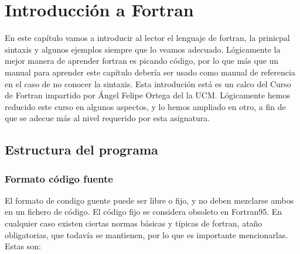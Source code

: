 \chapter{Introducción a Fortran}

En este capítulo vamos a introducir al lector el lenguaje de fortran, la prinicpal sintaxis y algunos ejemplos siempre que lo veamos adecuado. Lógicamente la mejor manera de aprender fortran es picando código, por lo que más que un manual para aprender este capítulo debería ser usado como manual de referencia en el caso de no conocer la sintaxis. Esta introdución está es un calco del Curso de Fortran impartido por Ángel Felipe Ortega del la UCM. Lógicamente hemos reducido este curso en algunos aspectos, y lo hemos ampliado en otro, a fin de que se adecue más al nivel requerido por esta asignatura.

\section{Estructura del programa}

\subsection{Formato código fuente}

El formato de condigo guente puede ser libre o fijo, y no deben mezclarse ambos en un fichero de código. El código fijo se considera obsoleto en Fortran95. En cualquier caso existen ciertas normas básicas y típicas de fortran, ataño obligatorias, que todavía se mantienen, por lo que es importante mencionarlas. Estas son:

